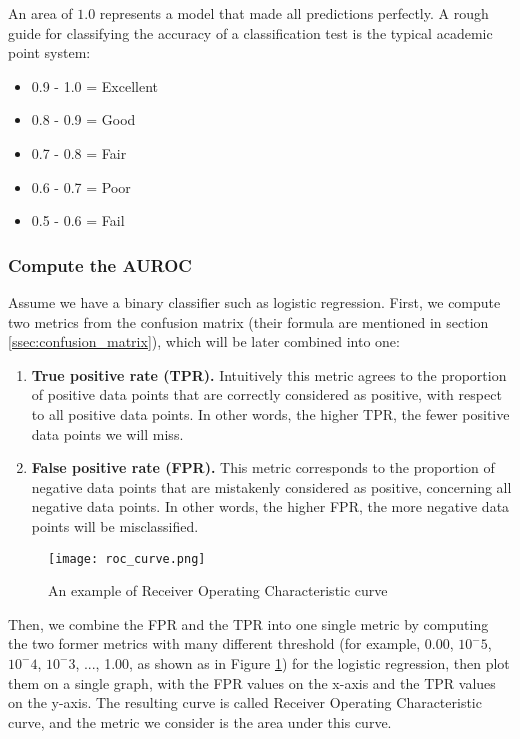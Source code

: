 An area of $1.0$ represents a model that made all predictions perfectly. A rough guide for classifying the accuracy of a classification test is the typical academic point system: 

\begin{itemize}
\item 0.9 - 1.0 = Excellent
\item 0.8 - 0.9 = Good
\item 0.7 - 0.8 = Fair
\item 0.6 - 0.7 = Poor
\item 0.5 - 0.6 = Fail
\end{itemize}

\subsubsection{Compute the AUROC}

Assume we have a binary classifier such as logistic regression. First, we compute two metrics from the confusion matrix (their formula are mentioned in section \ref{ssec:confusion_matrix}), which will be later combined into one:

\begin{enumerate}
    \item \textbf{True positive rate (TPR).} Intuitively this metric agrees to the proportion of positive data points that are correctly considered as positive, with respect to all positive data points. In other words, the higher TPR, the fewer positive data points we will miss.
    \item \textbf{False positive rate (FPR).} This metric corresponds to the proportion of negative data points that are mistakenly considered as positive, concerning all negative data points. In other words, the higher FPR, the more negative data points will be misclassified.
\end{enumerate}

\begin{figure}[H]
    \centering    
    \texttt{[image: roc\_curve.png]}
    \caption{An example of Receiver Operating Characteristic curve}
    \label{fig:auroc}
\end{figure}

Then, we combine the FPR and the TPR into one single metric by computing the two former metrics with many different threshold (for example, 0.00, $10^-5$, $10^-4$, $10^-3$, ..., 1.00, as shown as in Figure \ref{fig:auroc}) for the logistic regression, then plot them on a single graph, with the FPR values on the x-axis and the TPR values on the y-axis. The resulting curve is called  Receiver Operating Characteristic curve, and the metric we consider is the area under this curve.

